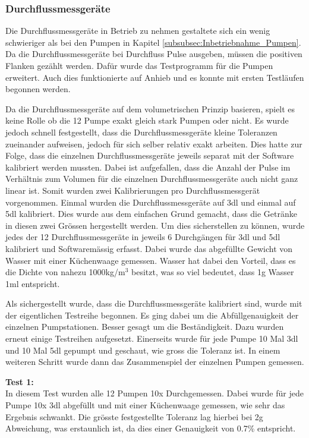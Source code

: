 \subsubsection{Durchflussmessgeräte}
\label{subsubsec:Inbetriebnahme_Durchflussmessgeräte}

Die Durchflussmessgeräte in Betrieb zu nehmen gestaltete sich ein wenig schwieriger als bei den Pumpen in Kapitel \ref{subsubsec:Inbetriebnahme_Pumpen}. Da die Durchflussmessgeräte bei Durchfluss Pulse ausgeben, müssen die positiven Flanken gezählt werden. Dafür wurde das Testprogramm für die Pumpen erweitert. Auch dies funktionierte auf Anhieb und es konnte mit ersten Testläufen begonnen werden. 

Da die Durchflussmessgeräte auf dem volumetrischen Prinzip basieren, spielt es keine Rolle ob die 12 Pumpe exakt gleich stark Pumpen oder nicht. Es wurde jedoch schnell festgestellt, dass die Durchflussmessgeräte kleine Toleranzen zueinander aufweisen, jedoch für sich selber relativ exakt arbeiten. Dies hatte zur Folge, dass die einzelnen Durchflussmessgeräte jeweils separat mit der Software kalibriert werden mussten. Dabei ist aufgefallen, dass die Anzahl der Pulse im Verhältnis zum Volumen für die einzelnen Durchflussmessgeräte auch nicht ganz linear ist. Somit wurden zwei Kalibrierungen pro Durchflussmessgerät vorgenommen. Einmal wurden die Durchflussmessgeräte auf 3dl und einmal auf 5dl kalibriert. Dies wurde aus dem einfachen Grund gemacht, dass die Getränke in diesen zwei Grössen hergestellt werden. Um dies sicherstellen zu können, wurde jedes der 12 Durchflussmessgeräte in jeweils 6 Durchgängen für 3dl und 5dl kalibriert und Softwaremässig erfasst. Dabei wurde das abgefüllte Gewicht von Wasser mit einer Küchenwaage gemessen. Wasser hat dabei den Vorteil, dass es die Dichte von nahezu 1000kg/m$^3$ besitzt, was so viel bedeutet, dass 1g Wasser 1ml entspricht. \cite{wagner_iapws_2002}


Als sichergestellt wurde, dass die Durchflussmessgeräte kalibriert sind, wurde mit der eigentlichen Testreihe begonnen. Es ging dabei um die Abfüllgenauigkeit der einzelnen Pumpstationen. Besser gesagt um die Beständigkeit. Dazu wurden erneut einige Testreihen aufgesetzt. Einerseits wurde für jede Pumpe 10 Mal 3dl und 10 Mal 5dl gepumpt und geschaut, wie gross die Toleranz ist. In einem weiteren Schritt wurde dann das Zusammenspiel der einzelnen Pumpen gemessen. 

\textbf{Test 1:} \\
In diesem Test wurden alle 12 Pumpen 10x Durchgemessen. Dabei wurde für jede Pumpe 10x 3dl abgefüllt und mit einer Küchenwaage gemessen, wie sehr das Ergebnis schwankt. Die grösste festgestellte Toleranz lag hierbei bei 2g Abweichung, was erstaunlich ist, da dies einer Genauigkeit von 0.7\% entspricht.

